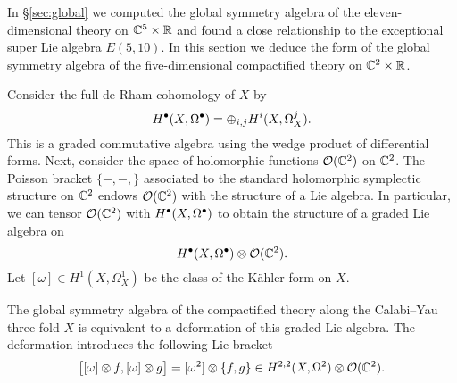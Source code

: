 \parsec[s:5dglobal]

In \S \ref{sec:global} we computed the global symmetry algebra of the eleven-dimensional theory on $\mathbb C^5 \times \mathbb R$ and found a close relationship to the exceptional super Lie algebra $E(5,10)$. 
In this section we deduce the form of the global symmetry algebra of the five-dimensional compactified theory on $\mathbb C^2 \times \mathbb R$. 

Consider the full de Rham cohomology of $X$ by
\[
H^\bullet (X, \Omega^\bullet) = \oplus_{i,j} H^i (X, \Omega^j_X)  .
\]
This is a graded commutative algebra using the wedge product of differential forms. 
Next, consider the space of holomorphic functions $\mathcal O(\mathbb C^2)$ on $\mathbb C^2$. 
The Poisson bracket $\{-,-,\}$ associated to the standard holomorphic symplectic structure on $\mathbb C^2$ endows $\mathcal O(\mathbb C^2)$ with the structure of a Lie algebra. 
In particular, we can tensor $\mathcal O(\mathbb C^2)$ with $H^\bullet (X, \Omega^\bullet)$ to obtain the structure of a graded Lie algebra on 
\[
H^\bullet (X, \Omega^\bullet) \otimes \mathcal O(\mathbb C^2) .
\]
Let $[\omega] \in H^1(X, \Omega^1_X)$ be the class of the K\"ahler form on $X$.

The global symmetry algebra of the compactified theory along the Calabi--Yau three-fold $X$ is equivalent to a deformation of this graded Lie algebra. 
The deformation introduces the following Lie bracket 
\[
\big[ [\omega] \otimes f, [\omega] \otimes g\big] = [\omega^2] \otimes \{f,g\} \in H^{2,2}(X, \Omega^2) \otimes \mathcal O(\mathbb C^2) . 
\]

